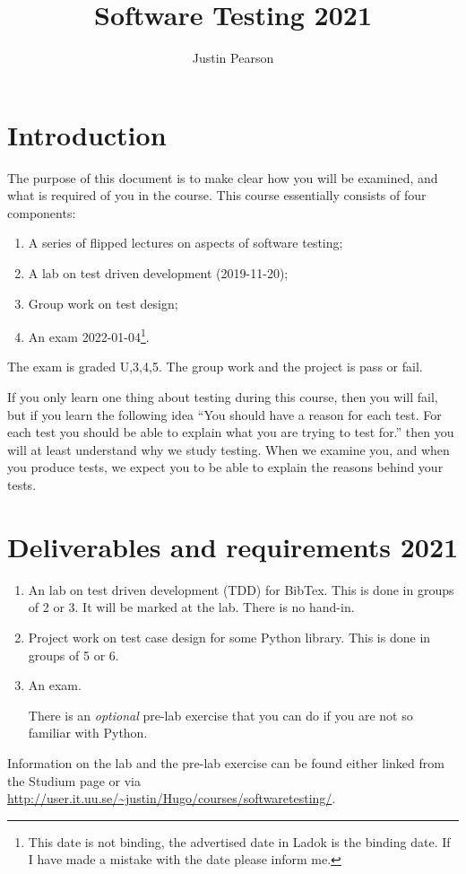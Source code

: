 \documentclass[a4paper]{article}
\title{Software Testing 2021}
\author{Justin Pearson }
\begin{document}
\maketitle
\def\UrlBreaks{\do\/\do-} 

\section{Introduction}
The purpose of this document is to make clear how you will be examined, and
what is required of you in the course.  This course essentially consists of
four components:
\begin{enumerate}
\item A series of flipped lectures on aspects of software testing;
 \item A lab on test driven development (2019-11-20);
\item Group work on test design;
\item An exam 2022-01-04\footnote{This date is not binding, the
    advertised date in Ladok is the binding date. If I have made a
    mistake with the date please inform me.}. 
\end{enumerate}
The exam is graded U,3,4,5. The group work and the project is pass or fail.

If you only learn one thing about testing during this course, then you
will fail, but if you learn the following idea ``You should have a
reason for each test. For each test you should be able to explain what
you are trying to test for.'' then you will at least understand why we
study testing. When we examine you, and when you produce tests, we
expect you to be able to explain the reasons behind your tests.


\section{Deliverables and requirements  2021}



\begin{enumerate}
\item An lab on  test driven development (TDD) for  BibTex.   This is
  done in groups of 2 or 3. It will be marked at the lab. There is no
  hand-in. 
\item Project work on test case design for some Python library. This
  is done in groups of 5 or 6.
\item An exam.

There is an {\em optional} pre-lab exercise that you can do if you are
not so familiar with Python.  


  
  
  \end{enumerate}
  Information on the lab and the pre-lab exercise can be found either
  linked from the Studium page or via
  \url{http://user.it.uu.se/~justin/Hugo/courses/softwaretesting/}.
\end{document}
